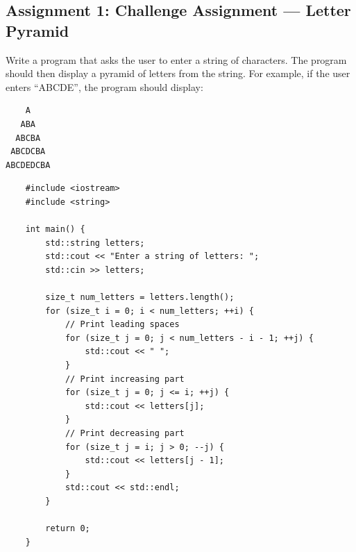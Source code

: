 \subsection{Assignment 1: Challenge Assignment --- Letter Pyramid}
Write a program that asks the user to enter a string of characters. The program should then display a pyramid of letters from the string. For example, if the user enters ``ABCDE'', the program should display:
\begin{center}
\begin{verbatim}
    A
   ABA
  ABCBA
 ABCDCBA
ABCDEDCBA
\end{verbatim}
\end{center}
\begin{lstlisting}
	#include <iostream>
	#include <string>

	int main() {
		std::string letters;
		std::cout << "Enter a string of letters: ";
		std::cin >> letters;

		size_t num_letters = letters.length();
		for (size_t i = 0; i < num_letters; ++i) {
			// Print leading spaces
			for (size_t j = 0; j < num_letters - i - 1; ++j) {
				std::cout << " ";
			}
			// Print increasing part
			for (size_t j = 0; j <= i; ++j) {
				std::cout << letters[j];
			}
			// Print decreasing part
			for (size_t j = i; j > 0; --j) {
				std::cout << letters[j - 1];
			}
			std::cout << std::endl;
		}

		return 0;
	}
\end{lstlisting}

